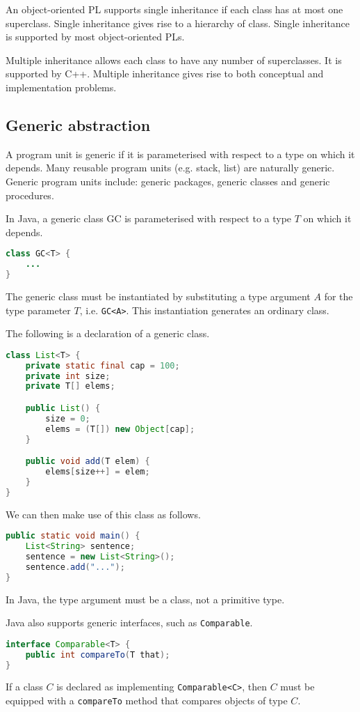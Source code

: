 \documentclass[a4paper, openany]{memoir}
\begin{document}
An object-oriented PL supports single inheritance if each class has at most one superclass. Single inheritance gives rise to a hierarchy of class. Single inheritance is supported by most object-oriented PLs. 

Multiple inheritance allows each class to have any number of superclasses. It is supported by C++. Multiple inheritance gives rise to both conceptual and implementation problems.

\subsection{Generic abstraction}
A program unit is generic if it is parameterised with respect to a type on which it depends. Many reusable program units (e.g. stack, list) are naturally generic. Generic program units include: generic packages, generic classes and generic procedures.

In Java, a generic class GC is parameterised with respect to a type $T$ on which it depends.
\begin{lstlisting}[language=Java]
class GC<T> {
    ...
}
\end{lstlisting}
The generic class must be instantiated by substituting a type argument $A$ for the type parameter $T$, i.e. \texttt{GC<A>}. This instantiation generates an ordinary class.

The following is a declaration of a generic class.
\begin{lstlisting}[language=Java]
class List<T> {
    private static final cap = 100;
    private int size;
    private T[] elems;

    public List() {
        size = 0;
        elems = (T[]) new Object[cap];
    }

    public void add(T elem) {
        elems[size++] = elem;
    }
}
\end{lstlisting}
We can then make use of this class as follows.
\begin{lstlisting}[language=Java]
public static void main() {
    List<String> sentence;
    sentence = new List<String>();
    sentence.add("...");
}
\end{lstlisting}
In Java, the type argument must be a class, not a primitive type.

Java also supports generic interfaces, such as \texttt{Comparable}.
\begin{lstlisting}[language=Java]
interface Comparable<T> {
    public int compareTo(T that);
}
\end{lstlisting}
If a class $C$ is declared as implementing \texttt{Comparable<C>}, then $C$ must be equipped with a \texttt{compareTo} method that compares objects of type $C$.
\end{document}

